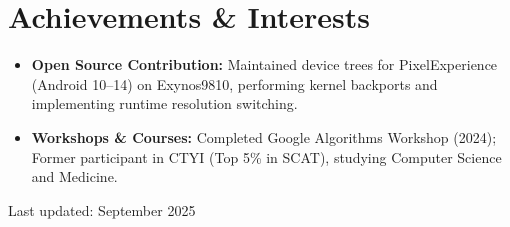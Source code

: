 \documentclass[10pt,a4paper]{article}
\begin{document}
\section*{Achievements \& Interests}
\begin{itemize}
    \item \textbf{Open Source Contribution:} Maintained device trees for PixelExperience (Android 10--14) on Exynos9810, performing kernel backports and implementing runtime resolution switching.
    \item \textbf{Workshops \& Courses:} Completed Google Algorithms Workshop (2024); Former participant in CTYI (Top 5\% in SCAT), studying Computer Science and Medicine.
\end{itemize}

\vfill
\begin{center}
    \small Last updated: September 2025
\end{center}
\end{document}
